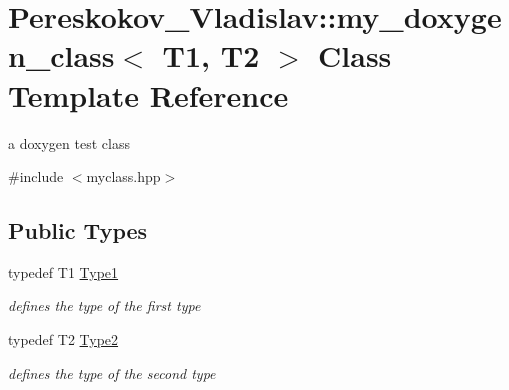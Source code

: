 \hypertarget{classPereskokov__Vladislav_1_1my__doxygen__class}{}\section{Pereskokov\+\_\+\+Vladislav\+:\+:my\+\_\+doxygen\+\_\+class$<$ T1, T2 $>$ Class Template Reference}
\label{classPereskokov__Vladislav_1_1my__doxygen__class}


a doxygen test class  




{\ttfamily \#include $<$myclass.\+hpp$>$}

\subsection*{Public Types}
\begin{DoxyCompactItemize}
\item 
\mbox{\label{classPereskokov__Vladislav_1_1my__doxygen__class_a33164ad348d3d58b99b7e9359f3d3cd7}} 
typedef T1 \hyperlink{classPereskokov__Vladislav_1_1my__doxygen__class_a33164ad348d3d58b99b7e9359f3d3cd7}{Type1}
\begin{DoxyCompactList}\small\item\em defines the type of the first type \end{DoxyCompactList}\item 
\mbox{\label{classPereskokov__Vladislav_1_1my__doxygen__class_ae6f4cd43e877656cf80d45d6d5d41fe4}} 
typedef T2 \hyperlink{classPereskokov__Vladislav_1_1my__doxygen__class_ae6f4cd43e877656cf80d45d6d5d41fe4}{Type2}
\begin{DoxyCompactList}\small\item\em defines the type of the second type \end{DoxyCompactList}\end{DoxyCompactItemize}
